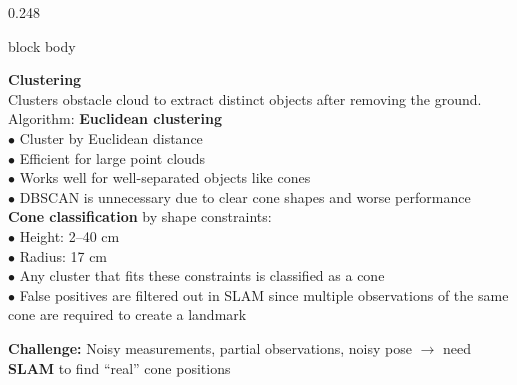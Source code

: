 \documentclass[final]{beamer}
\begin{document}
\begin{frame}[t,fragile]{}
\begin{columns}[t,totalwidth=\textwidth]
\begin{column}{0.248\textwidth}
\begin{beamercolorbox}[rounded=true,sep=0.38cm,wd=\linewidth]{block body}
  \vspace{0.3cm}
  \begin{tcolorbox}[pbox]
    {\color{primary}\bfseries Clustering}\\[3pt]
    \small
    Clusters obstacle cloud to extract distinct objects after removing the ground.\\[3pt]
    Algorithm: \textbf{Euclidean clustering}\\
    $\bullet$ Cluster by Euclidean distance\\
    $\bullet$ Efficient for large point clouds\\
    $\bullet$ Works well for well-separated objects like cones\\
    $\bullet$ DBSCAN is unnecessary due to clear cone shapes and worse performance\\
    \textbf{Cone classification} by shape constraints:\\
    $\bullet$ Height: 2--40 cm\\
    $\bullet$ Radius: 17 cm\\
    $\bullet$ Any cluster that fits these constraints is classified as a cone\\
    $\bullet$ False positives are filtered out in SLAM since multiple observations of the same cone are required to create a landmark
  \end{tcolorbox}

  \vspace{0.3cm}

  \vspace{0.3cm}
  \begin{tcolorbox}[ybox]
    \small\color{darkprimary}
    \textbf{Challenge:} Noisy measurements, partial observations, noisy pose
    $\to$ need \textbf{SLAM} to find ``real'' cone positions
  \end{tcolorbox}


\end{beamercolorbox}
\end{column}
\end{columns}
\end{frame}
\end{document}
